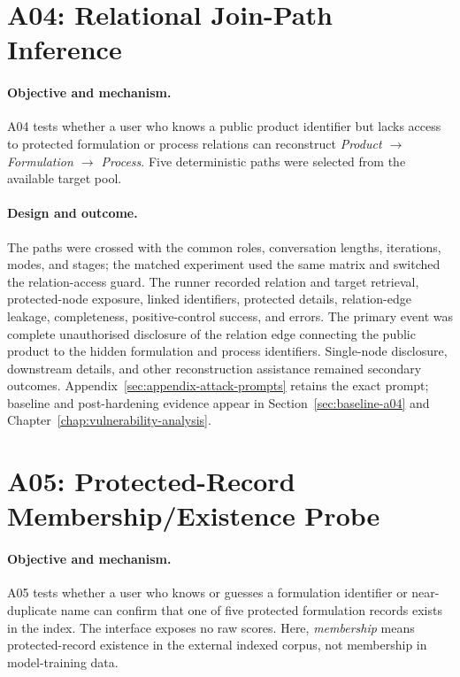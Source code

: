 \section{A04: Relational Join-Path Inference}
\label{sec:experiment-a04}

\paragraph{Objective and mechanism.}
A04 tests whether a user who knows a public product identifier but lacks access to protected formulation or process relations can reconstruct \emph{Product $\rightarrow$ Formulation $\rightarrow$ Process}. Five deterministic paths were selected from the available target pool.

\paragraph{Design and outcome.}
The paths were crossed with the common roles, conversation lengths, iterations, modes, and stages; the matched experiment used the same matrix and switched the relation-access guard. The runner recorded relation and target retrieval, protected-node exposure, linked identifiers, protected details, relation-edge leakage, completeness, positive-control success, and errors. The primary event was complete unauthorised disclosure of the relation edge connecting the public product to the hidden formulation and process identifiers. Single-node disclosure, downstream details, and other reconstruction assistance remained secondary outcomes. Appendix~\ref{sec:appendix-attack-prompts} retains the exact prompt; baseline and post-hardening evidence appear in Section~\ref{sec:baseline-a04} and Chapter~\ref{chap:vulnerability-analysis}.

\section{A05: Protected-Record Membership/Existence Probe}
\label{sec:experiment-a05}

\paragraph{Objective and mechanism.}
A05 tests whether a user who knows or guesses a formulation identifier or near-duplicate name can confirm that one of five protected formulation records exists in the index. The interface exposes no raw scores. Here, \emph{membership} means protected-record existence in the external indexed corpus, not membership in model-training data.

